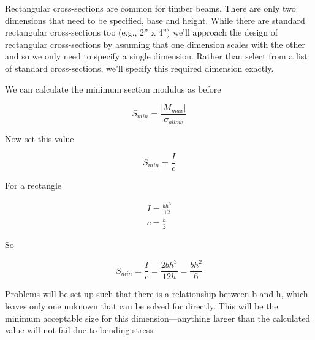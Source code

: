 \documentclass[
  letterpaper,
  DIV=11,
  numbers=noendperiod]{scrreprt}
\theoremstyle{definition}
\theoremstyle{remark}
\begin{document}
Rectangular cross-sections are common for timber beams. There are only
two dimensions that need to be specified, base and height. While there
are standard rectangular cross-sections too (e.g., 2'' x 4'') we'll
approach the design of rectangular cross-sections by assuming that one
dimension scales with the other and so we only need to specify a single
dimension. Rather than select from a list of standard cross-sections,
we'll specify this required dimension exactly.

We can calculate the minimum section modulus as before

\[
S_{min}=\frac{\left|M_{max}\right|}{\sigma_{allow}}
\]

Now set this value

\[
S_{min}=\frac{I}{c}
\]

For a rectangle

\[
\begin{gathered}
I=\frac{b h^3}{12} \\
c=\frac{h}{2}
\end{gathered}
\]

So

\[
S_{min}=\frac{I}{c}=\frac{2 b h^3}{12 h}=\frac{b h^2}{6}
\]

Problems will be set up such that there is a relationship between b and
h, which leaves only one unknown that can be solved for directly. This
will be the minimum acceptable size for this dimension---anything larger
than the calculated value will not fail due to bending stress.
\end{document}
